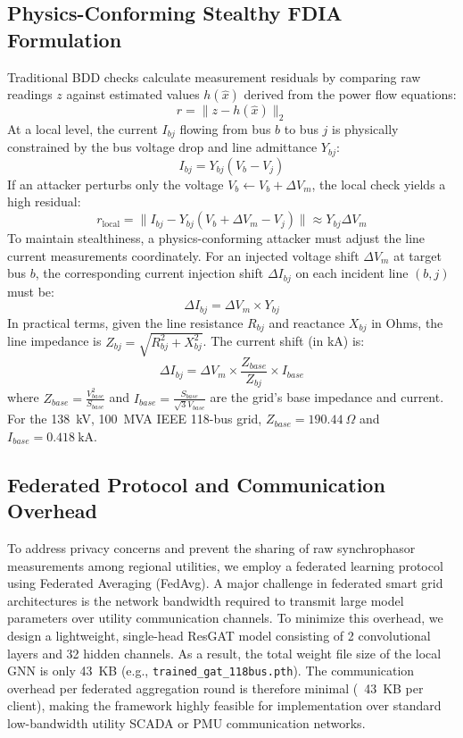\documentclass[10pt, a4paper, twocolumn]{article}
\begin{document}
\subsection{Physics-Conforming Stealthy FDIA Formulation}
Traditional BDD checks calculate measurement residuals by comparing raw readings $z$ against estimated values $h(\hat{x})$ derived from the power flow equations:
\begin{equation}
r = \|z - h(\hat{x})\|_2
\end{equation}
At a local level, the current $I_{bj}$ flowing from bus $b$ to bus $j$ is physically constrained by the bus voltage drop and line admittance $Y_{bj}$:
\begin{equation}
I_{bj} = Y_{bj} (V_b - V_j)
\end{equation}
If an attacker perturbs only the voltage $V_b \leftarrow V_b + \Delta V_m$, the local check yields a high residual:
\begin{equation}
r_{\text{local}} = \|I_{bj} - Y_{bj} (V_b + \Delta V_m - V_j)\| \approx Y_{bj} \Delta V_m
\end{equation}
To maintain stealthiness, a physics-conforming attacker must adjust the line current measurements coordinately. For an injected voltage shift $\Delta V_m$ at target bus $b$, the corresponding current injection shift $\Delta I_{bj}$ on each incident line $(b, j)$ must be:
\begin{equation}
\Delta I_{bj} = \Delta V_m \times Y_{bj}
\end{equation}
In practical terms, given the line resistance $R_{bj}$ and reactance $X_{bj}$ in Ohms, the line impedance is $Z_{bj} = \sqrt{R_{bj}^2 + X_{bj}^2}$. The current shift (in kA) is:
\begin{equation}
\Delta I_{bj} = \Delta V_m \times \frac{Z_{base}}{Z_{bj}} \times I_{base}
\end{equation}
where $Z_{base} = \frac{V_{base}^2}{S_{base}}$ and $I_{base} = \frac{S_{base}}{\sqrt{3}V_{base}}$ are the grid's base impedance and current. For the 138~kV, 100~MVA IEEE 118-bus grid, $Z_{base} = 190.44\ \Omega$ and $I_{base} = 0.418\ \text{kA}$.

\subsection{Federated Protocol and Communication Overhead}
To address privacy concerns and prevent the sharing of raw synchrophasor measurements among regional utilities, we employ a federated learning protocol using Federated Averaging (FedAvg). A major challenge in federated smart grid architectures is the network bandwidth required to transmit large model parameters over utility communication channels. To minimize this overhead, we design a lightweight, single-head ResGAT model consisting of 2 convolutional layers and 32 hidden channels. As a result, the total weight file size of the local GNN is only 43~KB (e.g., \texttt{trained\_gat\_118bus.pth}). The communication overhead per federated aggregation round is therefore minimal (~43~KB per client), making the framework highly feasible for implementation over standard low-bandwidth utility SCADA or PMU communication networks.
\end{document}
